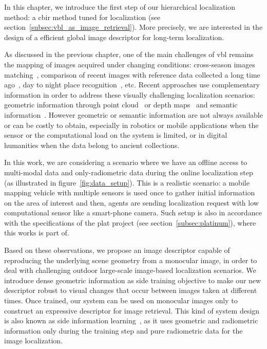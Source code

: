 In this chapter, we introduce the first step of our hierarchical localization method: a \ac{cbir} method tuned for localization (see section~\ref{subsec:vbl_as_image_retrieval}). More precisely, we are interested in the design of a efficient global image descriptor for long-term localization.

As discussed in the previous chapter, one of the main challenges of \ac{vbl} remains the mapping of images acquired under changing conditions: cross-season images matching~\cite{Naseer2017a}, comparison of recent images with reference data collected a long time ago~\cite{Toft2018}, day to night place recognition~\cite{Torii2015}, etc. Recent approaches use complementary information in order to address these visually challenging localization scenarios: geometric information through point cloud~\cite{Sattler2018,Schonberger2017a} or depth maps~\cite{Christie2016} and semantic information~\cite{Ardeshir2014,Christie2016,Naseer2017a}. However geometric or semantic information are not always available or can be costly to obtain, especially in robotics or mobile applications when the sensor or the computational load on the system is limited, or in digital humanities when the data belong to ancient collections. 

In this work, we are considering a scenario where we have an offline access to multi-modal data and only-radiometric data during the online localization step (as illustrated in figure~\ref{fig:data_setup}). This is a realistic scenario: a mobile mapping vehicle with multiple sensors is used once to gather initial information on the area of interest and then, agents are sending localization request with low computational sensor like a smart-phone camera. Such setup is also in accordance with the specifications of the \ac{plat} project (see section~\ref{subsec:platinum}), where this works is part of.

Based on these observations, we propose an image descriptor capable of reproducing the underlying scene geometry from a monocular image, in order to deal with challenging outdoor large-scale image-based localization scenarios. We introduce dense geometric information as side training objective to make our new descriptor robust to visual changes that occur between images taken at different times. Once trained, our system can be used on monocular images only to construct an expressive descriptor for image retrieval. This kind of system design is also known as side information learning~\cite{Hoffman2016}, as it uses geometric and radiometric information only during the training step and pure radiometric data for the image localization.  

